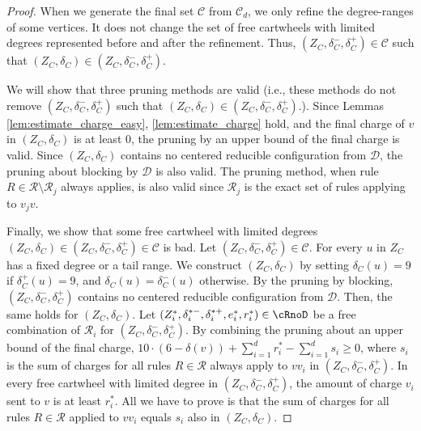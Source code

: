 \documentclass[10pt,a4paper]{article}
\begin{document}
\begin{proof}
    When we generate the final set $\mathcal{C}$ from $\mathcal{C}_d$, we only refine the degree-ranges of some vertices.
    It does not change the set of free cartwheels with limited degrees represented before and after the refinement.
    Thus, $(Z_C, \delta_C^-, \delta_C^+) \in \mathcal{C}$ such that $(Z_C, \delta_C) \in (Z_C, \delta_C^-, \delta_C^+)$.

    We will show that three pruning methods are valid (i.e., these methods do not remove $(Z_C, \delta_C^-, \delta_C^+)$ such that $(Z_C, \delta_C) \in (Z_C, \delta_C^-, \delta_C^+)$.).
    Since Lemmas \ref{lem:estimate_charge_easy}, \ref{lem:estimate_charge} hold, and the final charge of $v$ in $(Z_C, \delta_C)$ is at least 0, the pruning by an upper bound of the final charge is valid.
    Since $(Z_C, \delta_C)$ contains no centered reducible configuration from $\mathcal{D}$, the pruning about blocking by $\mathcal{D}$ is also valid.
    The pruning method, when rule $R \in \mathcal{R} \setminus \mathcal{R}_j$ always applies, is also valid since $\mathcal{R}_j$ is the exact set of rules applying to $v_jv$.

    Finally, we show that some free cartwheel with limited degrees $(Z_C, \delta_C) \in (Z_C, \delta_C^-, \delta_C^+) \in \mathcal{C}$ is bad.
    Let $(Z_C, \delta_C^-, \delta_C^+) \in \mathcal{C}$.
    For every $u$ in $Z_C$ has a fixed degree or a tail range.
    We construct $(Z_C, \delta_C)$ by setting $\delta_C(u)=9$ if $\delta_C^+(u)=9$, and $\delta_C(u)=\delta_C^-(u)$ otherwise.
    By the pruning by blocking, $(Z_C, \delta_C^-, \delta_C^+)$ contains no centered reducible configuration from $\mathcal{D}$.
    Then, the same holds for $(Z_C, \delta_C)$.
    Let $(Z_i^*, \delta_i^{*-}, \delta_i^{*+}, e_i^*, r_i^*) \in \cRnoD$ be a free combination of $\mathcal{R}_i$ for $(Z_C, \delta_C^-, \delta_C^+)$.
    By combining the pruning about an upper bound of the final charge, $10 \cdot (6 - \delta(v)) + \sum_{i=1}^d r_i^* - \sum_{i=1}^d s_i \geq 0$, where $s_i$ is the sum of charges for all rules $R \in \mathcal{R}$ always apply to $vv_i$ in $(Z_C, \delta_C^-, \delta_C^+)$.
    In every free cartwheel with limited degree in $(Z_C, \delta_C^-, \delta_C^+)$, the amount of charge $v_i$ sent to $v$ is at least $r_i^*$.
    All we have to prove is that the sum of charges for all rules $R \in \mathcal{R}$ applied to $vv_i$ equals $s_i$ also in $(Z_C, \delta_C)$.


\end{proof}
\end{document}
